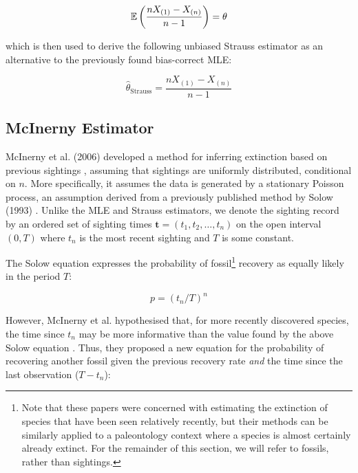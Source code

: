 \[
\mathbb{E} \left( \frac{nX_{(1)} - X_{(n)}}{n-1} \right) = \theta
\]

which is then used to derive the following unbiased Strauss estimator as an alternative to the previously found bias-correct MLE:

\begin{equation}\label{eq:strauss}
\hat\theta_{\text{Strauss}} = \frac{n X_{(1)} - X_{(n)}}{n-1}
\end{equation}




\subsection{McInerny Estimator}

McInerny et al. (2006) developed a method for inferring extinction based on previous sightings \parencite{Mcinerny2006}, assuming that sightings are uniformly distributed, conditional on $n$. More specifically, it assumes the data is generated by a stationary Poisson process, an assumption derived from a previously published method by Solow (1993) \parencite{Solow1993}. Unlike the MLE and Strauss estimators, we denote the sighting record by an ordered set of sighting times $\mathbf{t} = (t_1, t_2, \dots, t_n)$ on the open interval $(0, T)$ where $t_n$ is the most recent sighting and $T$ is some constant.

The Solow equation expresses the probability of fossil\footnote{Note that these papers were concerned with estimating the extinction of species that have been seen relatively recently, but their methods can be similarly applied to a paleontology context where a species is almost certainly already extinct. For the remainder of this section, we will refer to fossils, rather than sightings.} recovery as equally likely in the period $T$:

\[
p = \left( t_n/T \right)^n
\]

However, McInerny et al. hypothesised that, for more recently discovered species, the time since $t_n$ may be more informative than the value found by the above Solow equation \parencite{Mcinerny2006}. Thus, they proposed a new equation for the probability of recovering another fossil given the previous recovery rate \textit{and} the time since the last observation ($T - t_n$):


